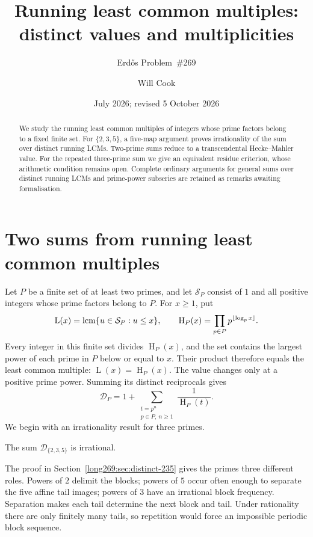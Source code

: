 \documentclass[11pt]{article}
\title{Running least common multiples:\\distinct values and multiplicities}
\subtitle{Erd\H{o}s Problem~\#269}
\author{Will Cook}
\date{July 2026; revised 5 October 2026}
\theoremstyle{remark}
\theoremstyle{plain}
\newcommand{\hgt}{\operatorname{H}}
\newcommand{\Lprefix}{\operatorname{L}}
\begin{document}
\maketitle
\noteprovenance

\begin{abstract}
We study the running least common multiples of integers whose prime
factors belong to a fixed finite set.
For $\{2,3,5\}$, a five-map argument proves irrationality of the sum over
distinct running LCMs. Two-prime sums reduce to a transcendental Hecke--Mahler
value. For the repeated three-prime sum we give an equivalent residue
criterion, whose arithmetic condition remains open. Complete ordinary
arguments for general sums over distinct running LCMs and prime-power subseries are
retained as remarks awaiting formalisation.
\end{abstract}

\section{Two sums from running least common multiples}\label{long269:sec:problem}
Let $P$ be a finite set of at least two primes, and let $\mathcal S_P$
consist of $1$ and all positive integers whose prime factors belong to
$P$. For $x\ge1$, put
\[
 \Lprefix(x)=\lcm\{u\in\mathcal S_P:u\le x\},\qquad
 \hgt_P(x)=\prod_{p\in P}p^{\lfloor\log_p x\rfloor}.
\]
Every integer in this finite set divides $\hgt_P(x)$, and the set
contains the largest power of each prime in $P$ below or equal to $x$.
Their product therefore equals the least common multiple:
$\Lprefix(x)=\hgt_P(x)$. The value changes only at a positive prime
power. Summing its distinct reciprocals gives
\[
 \mathcal D_P=1+\sum_{\substack{t=p^n\\p\in P,\ n\ge1}}\frac1{\hgt_P(t)}.
\]
We begin with an irrationality result for three primes.

\begin{theorem}\label{long269:res:distinct-height-235}
The sum $\mathcal D_{\{2,3,5\}}$ is irrational.
\end{theorem}

The proof in Section~\ref{long269:sec:distinct-235} gives the primes three
different roles. Powers of $2$ delimit the blocks; powers of $5$ occur
often enough to separate the five affine tail images; powers of $3$
have an irrational block frequency. Separation makes each tail determine
the next block and tail. Under rationality there are only finitely many
tails, so repetition would force an impossible periodic block sequence.
\end{document}
